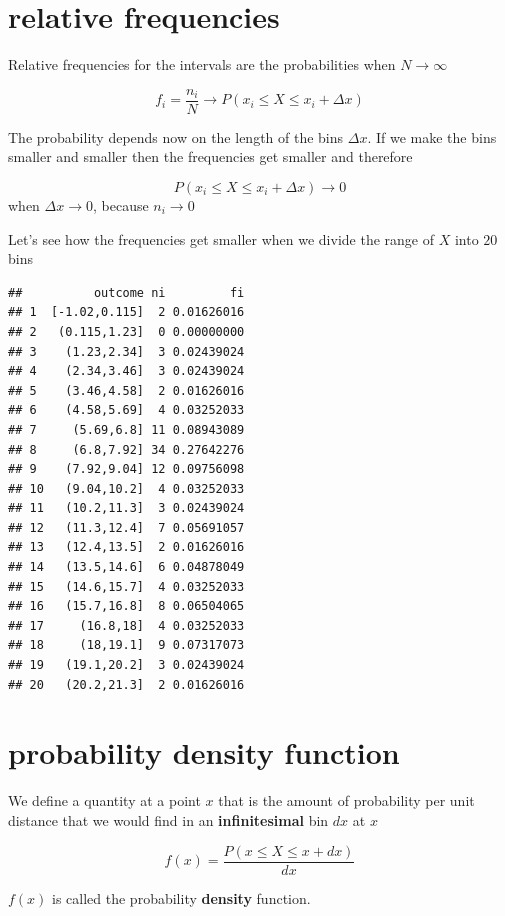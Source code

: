\documentclass[
]{book}
\begin{document}
\hypertarget{relative-frequencies-3}{%
\section{relative frequencies}\label{relative-frequencies-3}}

Relative frequencies for the intervals are the probabilities when \(N \rightarrow \infty\)

\[f_i=\frac{n_i}{N} \rightarrow P(x_i \leq X  \leq x_i + \Delta x)\]

The probability depends now on the length of the bins \(\Delta x\). If we make the bins smaller and smaller then the frequencies get smaller and therefore

\[P(x_i \leq X  \leq x_i + \Delta x) \rightarrow 0\] when \(\Delta x \rightarrow 0\), because \(n_i \rightarrow 0\)

Let's see how the frequencies get smaller when we divide the range of \(X\) into \(20\) bins

\begin{verbatim}
##          outcome ni         fi
## 1  [-1.02,0.115]  2 0.01626016
## 2   (0.115,1.23]  0 0.00000000
## 3    (1.23,2.34]  3 0.02439024
## 4    (2.34,3.46]  3 0.02439024
## 5    (3.46,4.58]  2 0.01626016
## 6    (4.58,5.69]  4 0.03252033
## 7     (5.69,6.8] 11 0.08943089
## 8     (6.8,7.92] 34 0.27642276
## 9    (7.92,9.04] 12 0.09756098
## 10   (9.04,10.2]  4 0.03252033
## 11   (10.2,11.3]  3 0.02439024
## 12   (11.3,12.4]  7 0.05691057
## 13   (12.4,13.5]  2 0.01626016
## 14   (13.5,14.6]  6 0.04878049
## 15   (14.6,15.7]  4 0.03252033
## 16   (15.7,16.8]  8 0.06504065
## 17     (16.8,18]  4 0.03252033
## 18     (18,19.1]  9 0.07317073
## 19   (19.1,20.2]  3 0.02439024
## 20   (20.2,21.3]  2 0.01626016
\end{verbatim}

\hypertarget{probability-density-function}{%
\section{probability density function}\label{probability-density-function}}

We define a quantity at a point \(x\) that is the amount of probability per unit distance that we would find in an \textbf{infinitesimal} bin \(dx\) at \(x\)

\[f(x)= \frac{P(x\leq X \leq x+dx)}{dx}\]

\(f(x)\) is called the probability \textbf{density} function.
\end{document}
